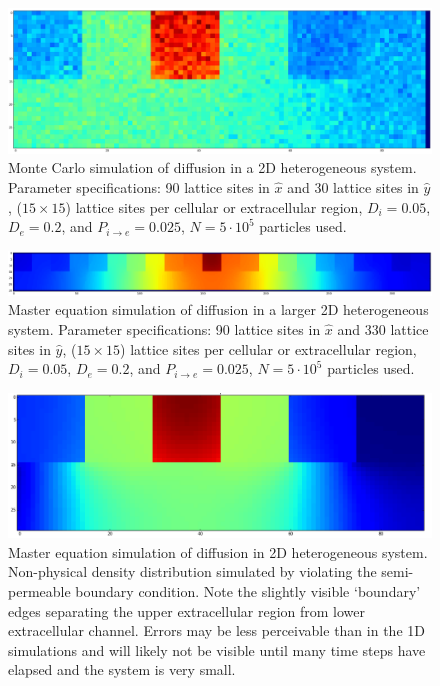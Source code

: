 	\begin{figure}[h!]
		\centering
		\includegraphics[width=1.0\linewidth]{../images/2D/MC_heterogeneous_3U_2D}
		\caption{Monte Carlo simulation of diffusion in a 2D heterogeneous system. Parameter specifications: 90 lattice sites in $ \hat{x} $ and 30 lattice sites in $ \hat{y} $, ($ 15 \times 15 $) lattice sites per cellular or extracellular region, $ D_i = 0.05 $, $ D_e = 0.2 $, and $ P_{i\rightarrow e} = 0.025 $, $ N = 5 \cdot 10^5 $ particles used.}
		\label{fig:MC_heterogeneous_3U_2D}
	\end{figure}
	
	\begin{figure}[h!]
		\centering
		\includegraphics[width=1.0\linewidth]{../images/2D/heterogeneous_11U_2D}
		\caption{Master equation simulation of diffusion in a larger 2D heterogeneous system. Parameter specifications: 90 lattice sites in $ \hat{x} $ and 330 lattice sites in $ \hat{y} $, ($ 15 \times 15 $) lattice sites per cellular or extracellular region, $ D_i = 0.05 $, $ D_e = 0.2 $, and $ P_{i\rightarrow e} = 0.025 $, $ N = 5 \cdot 10^5 $ particles used.}
		\label{fig:heterogeneous_11U_2D}
	\end{figure}
	
	\begin{figure}[h!]
		\centering
		\includegraphics[width=1.0\linewidth]{../images/2D/error_in_diffusion}
		\caption{Master equation simulation of diffusion in 2D heterogeneous system. Non-physical density distribution simulated by violating the semi-permeable boundary condition. Note the slightly visible `boundary' edges separating the upper extracellular region from lower extracellular channel. Errors may be less perceivable than in the 1D simulations and will likely not be visible until many time steps have elapsed and the system is very small.}
		\label{fig:error_in_diffusion}
	\end{figure}

